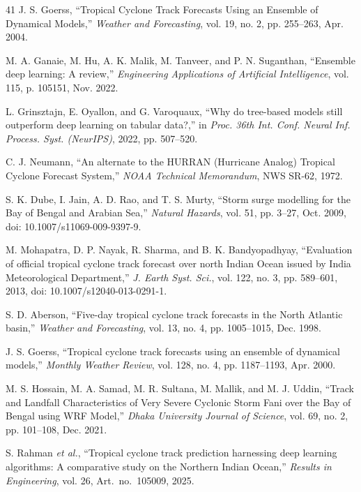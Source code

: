 \documentclass[conference]{IEEEtran}
\begin{document}
\begin{thebibliography}{41}
J. S. Goerss, ``Tropical Cyclone Track Forecasts Using an Ensemble of Dynamical Models,'' \textit{Weather and Forecasting}, vol. 19, no. 2, pp. 255--263, Apr. 2004.

M. A. Ganaie, M. Hu, A. K. Malik, M. Tanveer, and P. N. Suganthan, ``Ensemble deep learning: A review,'' \textit{Engineering Applications of Artificial Intelligence}, vol. 115, p. 105151, Nov. 2022.

L. Grinsztajn, E. Oyallon, and G. Varoquaux, ``Why do tree-based models still outperform deep learning on tabular data?,'' in \textit{Proc. 36th Int. Conf. Neural Inf. Process. Syst. (NeurIPS)}, 2022, pp. 507--520.

C. J. Neumann, ``An alternate to the HURRAN (Hurricane Analog) Tropical Cyclone Forecast System,'' \textit{NOAA Technical Memorandum}, NWS SR-62, 1972.

S. K. Dube, I. Jain, A. D. Rao, and T. S. Murty, ``Storm surge modelling for the Bay of Bengal and Arabian Sea,'' \textit{Natural Hazards}, vol. 51, pp. 3--27, Oct. 2009, doi: 10.1007/s11069-009-9397-9.

M. Mohapatra, D. P. Nayak, R. Sharma, and B. K. Bandyopadhyay, ``Evaluation of official tropical cyclone track forecast over north Indian Ocean issued by India Meteorological Department,'' \textit{J. Earth Syst. Sci.}, vol. 122, no. 3, pp. 589--601, 2013, doi: 10.1007/s12040-013-0291-1.

S. D. Aberson, ``Five-day tropical cyclone track forecasts in the North Atlantic basin,'' \textit{Weather and Forecasting}, vol. 13, no. 4, pp. 1005--1015, Dec. 1998.

J. S. Goerss, ``Tropical cyclone track forecasts using an ensemble of dynamical models,'' \textit{Monthly Weather Review}, vol. 128, no. 4, pp. 1187--1193, Apr. 2000.

M. S. Hossain, M. A. Samad, M. R. Sultana, M. Mallik, and M. J. Uddin, ``Track and Landfall Characteristics of Very Severe Cyclonic Storm Fani over the Bay of Bengal using WRF Model,'' \textit{Dhaka University Journal of Science}, vol. 69, no. 2, pp. 101--108, Dec. 2021.

S. Rahman \textit{et al.}, ``Tropical cyclone track prediction harnessing deep learning algorithms: A comparative study on the Northern Indian Ocean,'' \textit{Results in Engineering}, vol. 26, Art.\ no.\ 105009, 2025.


\end{thebibliography}
\end{document}

